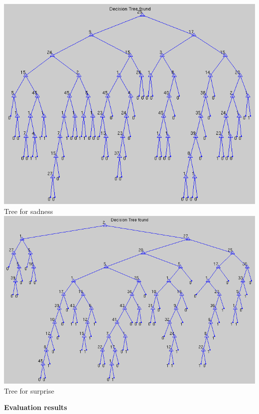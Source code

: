 \documentclass[12pt]{article}
\begin{document}
\begin{center}
  \includegraphics[scale=0.28]{report-images/tree5.png} \\
  Tree for sadness \\
  \vspace{\baselineskip}
  \includegraphics[scale=0.28]{report-images/tree6.png} \\
  Tree for surprise
\end{center}


{\bf Evaluation results} \\
\end{document}
